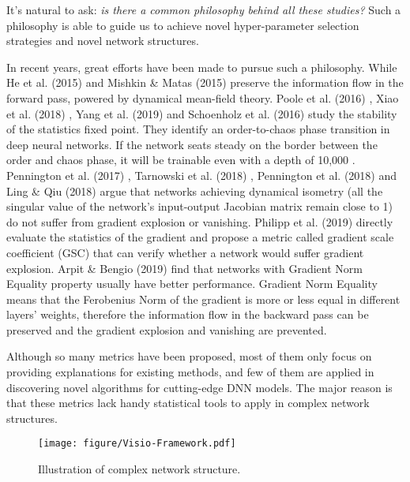 \documentclass[10pt,journal,compsoc]{IEEEtran}
\newcommand{\modify}[1]{{ #1}}
\begin{document}
\modify{It's natural to ask: \emph{is there a common philosophy behind all these studies?} Such a philosophy is able to guide us to achieve novel hyper-parameter selection strategies and novel network structures.

In recent years, great efforts have been made to pursue such a philosophy. While He et al. (2015) \cite{he2015delving} and  Mishkin \& Matas (2015) \cite{mishkin2015all} preserve the information flow in the forward pass, powered by dynamical mean-field theory. Poole et al. (2016) \cite{poole2016exponential}, Xiao et al. (2018) \cite{xiao2018dynamical}, Yang et al. (2019) \cite{yang2019mean} and Schoenholz et al. (2016) \cite{schoenholz2016deep} study the stability of the statistics fixed point. They identify an order-to-chaos phase transition in deep neural networks. If the network seats steady on the border between the order and chaos phase, it will be trainable even with a depth of 10,000 \cite{xiao2018dynamical}. Pennington et al. (2017) \cite{pennington2017resurrecting}, Tarnowski et al. (2018) \cite{tarnowski2018dynamical}, Pennington et al. (2018) \cite{pennington2018emergence} and Ling \& Qiu (2018) \cite{ling2018spectrum} argue that networks achieving dynamical isometry (all the singular value of the network's input-output Jacobian matrix remain close to 1) do not suffer from gradient explosion or vanishing. Philipp et al. (2019) \cite{philipp2018gradients} directly evaluate the statistics of the gradient and propose a metric called gradient scale coefficient (GSC) that can verify whether a network would suffer gradient explosion. Arpit \& Bengio (2019) \cite{arpit2019benefits} find that networks with Gradient Norm Equality property usually have better performance. Gradient Norm Equality means that the Ferobenius Norm of the gradient is more or less equal in different layers' weights, therefore the information flow in the backward pass can be preserved and the gradient explosion and vanishing are prevented.

Although so many metrics have been proposed, most of them only focus on providing explanations for existing methods, and few of them are applied in discovering novel algorithms for cutting-edge DNN models. The major reason is that these metrics lack handy statistical tools to apply in complex network structures.
\vspace{-20pt}
\begin{figure}[ht]
\centering
\texttt{[image: figure/Visio-Framework.pdf]}
\caption{Illustration of complex network structure.}
\vspace{-5pt}
\label{fig:framework}
\end{figure}

}
\end{document}
